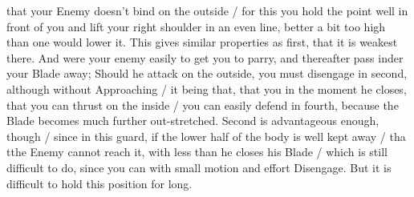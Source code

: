 \newpage


\newpage



that your Enemy doesn't bind on the outside / for this you hold the
point well in front of you and lift your right shoulder in an even
line, better a bit too high than one would lower it. This gives
similar properties as first, that it is weakest there. And
were your enemy easily to get you to parry, and thereafter pass inder
your Blade away; Should he attack on the
outside, you must disengage in second, although without Approaching /
it being that, that you in the moment he closes, that you can thrust
on the inside / you can easily defend in fourth, because the Blade
becomes much further out-stretched. Second is advantageous enough,
though / since in this guard, if the lower half of the body is well
kept away / tha tthe Enemy cannot reach it, with less than he closes
his Blade / which is still difficult to do, since you can with small
motion and effort Disengage. But it is difficult to hold this position
for long.


